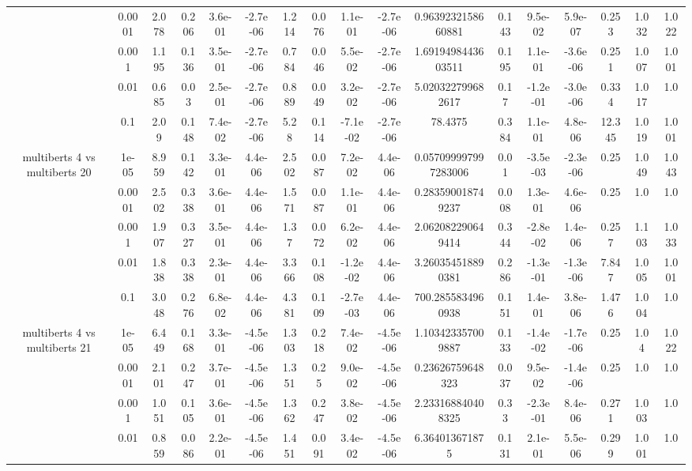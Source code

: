 \begin{tabular}{|c|c|c|c|c|c|c|c|c|c|c|c|c|c|c|c|c|}
 & 0.0001 & 2.078 & 0.206 & 3.6e-01 & -2.7e-06 & 1.214 & 0.076 & 1.1e-01 & -2.7e-06 & 0.9639232158660881 & 0.143 & 9.5e-02 & 5.9e-07 & 0.253 & 1.032 & 1.022 \\
 & 0.001 & 1.195 & 0.136 & 3.5e-01 & -2.7e-06 & 0.784 & 0.046 & 5.5e-02 & -2.7e-06 & 1.6919498443603511 & 0.195 & 1.1e-01 & -3.6e-06 & 0.251 & 1.007 & 1.001 \\
 & 0.01 & 0.685 & 0.03 & 2.5e-01 & -2.7e-06 & 0.889 & 0.049 & 3.2e-02 & -2.7e-06 & 5.020322799682617 & 0.17 & -1.2e-01 & -3.0e-06 & 0.334 & 1.017 & 1.0 \\
 & 0.1 & 2.09 & 0.148 & 7.4e-02 & -2.7e-06 & 5.28 & 0.114 & -7.1e-02 & -2.7e-06 & 78.4375 & 0.384 & 1.1e-01 & 4.8e-06 & 12.345 & 1.019 & 1.001 \\
\hline
\multirow{5}{*}{multiberts 4 vs multiberts 20} & 1e-05 & 8.959 & 0.142 & 3.3e-01 & 4.4e-06 & 2.502 & 0.087 & 7.2e-02 & 4.4e-06 & 0.057099997997283006 & 0.01 & -3.5e-03 & -2.3e-06 & 0.25 & 1.049 & 1.043 \\
 & 0.0001 & 2.502 & 0.338 & 3.6e-01 & 4.4e-06 & 1.571 & 0.087 & 1.1e-01 & 4.4e-06 & 0.283590018749237 & 0.008 & 1.3e-01 & 4.6e-06 & 0.25 & 1.0 & 1.0 \\
 & 0.001 & 1.907 & 0.327 & 3.5e-01 & 4.4e-06 & 1.37 & 0.072 & 6.2e-02 & 4.4e-06 & 2.062082290649414 & 0.344 & -2.8e-02 & 1.4e-06 & 0.257 & 1.103 & 1.033 \\
 & 0.01 & 1.838 & 0.338 & 2.3e-01 & 4.4e-06 & 3.366 & 0.108 & -1.2e-02 & 4.4e-06 & 3.260354518890381 & 0.286 & -1.3e-01 & -1.3e-06 & 7.847 & 1.005 & 1.001 \\
 & 0.1 & 3.048 & 0.276 & 6.8e-02 & 4.4e-06 & 4.381 & 0.109 & -2.7e-03 & 4.4e-06 & 700.2855834960938 & 0.151 & 1.4e-01 & 3.8e-06 & 1.476 & 1.004 & 1.0 \\
\hline
\multirow{5}{*}{multiberts 4 vs multiberts 21} & 1e-05 & 6.449 & 0.168 & 3.3e-01 & -4.5e-06 & 1.303 & 0.218 & 7.4e-02 & -4.5e-06 & 1.103423357009887 & 0.133 & -1.4e-02 & -1.7e-06 & 0.25 & 1.04 & 1.022 \\
 & 0.0001 & 2.101 & 0.247 & 3.7e-01 & -4.5e-06 & 1.351 & 0.25 & 9.0e-02 & -4.5e-06 & 0.23626759648323 & 0.037 & 9.5e-02 & -1.4e-06 & 0.25 & 1.0 & 1.0 \\
 & 0.001 & 1.051 & 0.105 & 3.6e-01 & -4.5e-06 & 1.362 & 0.247 & 3.8e-02 & -4.5e-06 & 2.233168840408325 & 0.33 & -2.3e-01 & 8.4e-06 & 0.271 & 1.003 & 1.0 \\
 & 0.01 & 0.859 & 0.086 & 2.2e-01 & -4.5e-06 & 1.451 & 0.091 & 3.4e-02 & -4.5e-06 & 6.364013671875 & 0.131 & 2.1e-01 & 5.5e-06 & 0.299 & 1.001 & 1.0 \\

\end{tabular}
